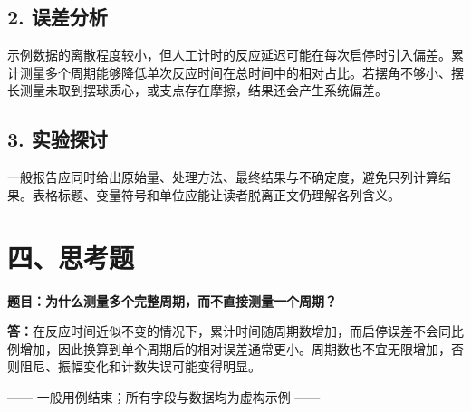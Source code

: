 \documentclass[a4paper]{article}
\begin{document}
\subsection*{2. 误差分析}
示例数据的离散程度较小，但人工计时的反应延迟可能在每次启停时引入偏差。累计测量多个周期能够降低单次反应时间在总时间中的相对占比。若摆角不够小、摆长测量未取到摆球质心，或支点存在摩擦，结果还会产生系统偏差。

\subsection*{3. 实验探讨}
一般报告应同时给出原始量、处理方法、最终结果与不确定度，避免只列计算结果。表格标题、变量符号和单位应能让读者脱离正文仍理解各列含义。

\section*{四、思考题}
\textbf{题目：为什么测量多个完整周期，而不直接测量一个周期？}

\textbf{答：}在反应时间近似不变的情况下，累计时间随周期数增加，而启停误差不会同比例增加，因此换算到单个周期后的相对误差通常更小。周期数也不宜无限增加，否则阻尼、振幅变化和计数失误可能变得明显。

\vfill
\begin{center}
  \small —— 一般用例结束；所有字段与数据均为虚构示例 ——
\end{center}
\end{document}
